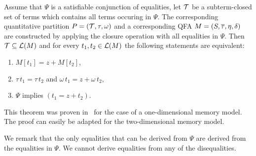 \begin{theorem}
  Assume that $\Psi$ is a satisfiable conjunction of equalities, let $\mathcal{T}$ be a subterm-closed set of terms which contains all terms occuring in $\Psi$.
  The corresponding quantitative partition $P = (\mathcal{T}, \tau,\omega)$ and a corresponding QFA $M = (S, \overline{\tau}, \eta, \delta)$ are constructed by applying the closure operation with all equalities in $\Psi$.
  Then $\mathcal{T} \subseteq \mathcal{L}(M)$ and for every $t_1, t_2 \in \mathcal{L}(M)$ the following statements are equivalent:
  \begin{enumerate}
    \item $M[t_1] = z + M[t_2]$,
    \item $\tau\,t_1 = \tau\,t_2$ and $\omega\,t_1 = z + \omega\,t_2$,
    \item $\Psi$ implies $(t_1 = z + t_2)$.
  \end{enumerate}
\end{theorem}

This theorem was proven in~\cite{2pointer} for the case of a one-dimensional memory model.
The proof can easily be adapted for the two-dimensional memory model.

We remark that the only equalities that can be derived from $\Psi$ are derived from the equalities in $\Psi$. We cannot derive equalities from any of the disequalities.
